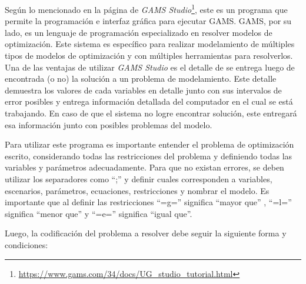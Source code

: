 Según lo mencionado en la página de \textit{GAMS Studio}\footnote{\url{https://www.gams.com/34/docs/UG_studio_tutorial.html}}, este es un programa que permite la programación e interfaz gráfica para ejecutar GAMS. GAMS, por su lado, es un lenguaje de programación especializado en resolver modelos de optimización. Este sistema es específico para realizar modelamiento de múltiples tipos de modelos de optimización y con múltiples herramientas para resolverlos. Una de las ventajas de utilizar \emph{GAMS Studio} es el detalle de se entrega luego de encontrada (o no) la solución a un problema de modelamiento. Este detalle demuestra los valores de cada variables en detalle junto con sus intervalos de error posibles y entrega información detallada del computador en el cual se está trabajando. En caso de que el sistema no logre encontrar solución, este entregará esa información junto con posibles problemas del modelo. 
\vspace{2.5mm}

Para utilizar este programa es importante entender el problema de optimización escrito, considerando todas las restricciones del problema y definiendo todas las variables y parámetros adecuadamente. Para que no existan errores, se deben utilizar los separadores como “;” y definir cuales corresponden a variables, escenarios, parámetros, ecuaciones, restricciones y nombrar el modelo. Es importante que al definir las restricciones “=g=” significa “mayor que” , “=l=” significa “menor que” y “=e=” significa “igual que”.

Luego, la codificación del problema a resolver debe seguir la siguiente forma y condiciones:

